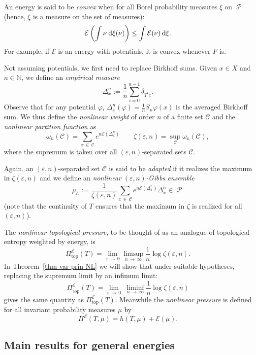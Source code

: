 \documentclass[AHL, Unicode, longabstracts,published]{cedram}
\theoremstyle{plain}
\theoremstyle{plain}
\newcommand\eps{\varepsilon}
\newcommand\NLP{\Pi}
\renewcommand\top{{\mathrm{top}}}
\newcommand\Prob{{\operatorname{\mathscr{P}}}}
\newcommand*{\dd} {\relax\ifnum\lastnodetype>0\mskip\medmuskip\fi\mathrm{d}}
\newcommand{\pot}{\varphi}
\newcounter{In}
\newcommand*\8{\infty}
\newcommand\NN{\mathbb{N}}
\newcommand{\En}{\mathcal{E}}
\newcommand{\cC}{\mathcal C}
\begin{document}
An energy is said to be \emph{convex} when for all Borel probability measures $\xi$ on $\Prob$ (hence, $\xi$ is a measure on the set of measures):
\[
\En\left(\int \nu \dd\xi(\nu) \right) \le \int \En(\nu) \dd\xi.
\]
For example, if $\En$ is an energy with potentials, it is convex whenever $F$ is.

Not assuming potentials, we first need to replace Birkhoff sums. Given $x\in X$ and $n\in\NN$, we define an \emph{empirical measure}
\[
\Delta_x^n := \frac1n \sum_{i=0}^{n-1} \delta_{T^ix}.
\]
Observe that for any potential $\pot$, $\Delta_x^n(\pot)=\frac1n S_n\pot(x)$ is the averaged Birkhoff sum. We thus define the \emph{nonlinear weight} of order $n$ of a finite set $\cC$ and the \emph{nonlinear partition function} as
\[
\omega_n(\cC) = \sum_{x\,\in\,\cC} e^{n\En(\Delta_x^n)} \qquad
\zeta(\eps,n) = \sup_{\cC} \omega_n(\cC),
\]
where the supremum is taken over all $(\eps,n)$-separated sets $\cC$.


Again, an $(\eps,n)$-separated set $\cC$ is said to be \emph{adapted} if it realizes the maximum in $\zeta(\eps,n)$ and we define an \emph{nonlinear $(\eps,n)$-Gibbs ensemble}
\begin{equation}\label{eq-def-ensemble}
\mu_{\cC} := \frac{1}{\zeta(\eps,n)} \sum_{x\,\in\,\cC} e^{n \En\left(\Delta_x^n\right)} \Delta_x^n \in\Prob
\end{equation}
(note that the continuity of $T$ ensures that the maximum in $\zeta$ is realized for all $(\eps,n)$).

The \emph{nonlinear topological pressure}, to be thought of as an analogue of topological entropy weighted by energy, is
\begin{equation}\label{eq:NLP}
\NLP_\top^\En(T) = \lim_{\eps\,\to\,0} \limsup_{n\,\to\,\infty} \frac1n \log \zeta(\eps,n).
\end{equation}
In Theorem~\ref{thm-var-prin-NL} we will show that under suitable hypotheses, replacing the supremum limit by an infimum limit:
\[
\underline{\NLP}_\top^\En(T) = \lim_{\eps\,\to\,0}\; \liminf_{n\,\to\,\infty} \frac1n \log \zeta(\eps,n)
\]
gives the same quantity as $\NLP_\top^\En(T) $. Meanwhile the \emph{nonlinear pressure} is defined for all invariant probability measures $\mu$ by
\[
\NLP^\En(T,\mu) = h(T,\mu) + \En(\mu).
\]


\subsection{Main results for general energies}
\end{document}

